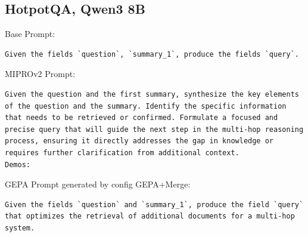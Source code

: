 \subsection{HotpotQA, Qwen3 8B}
\begin{instructbox}
Base Prompt:
\begin{lstlisting}[breakindent=0pt, breaklines=true, breakatwhitespace=true, frame=single, backgroundcolor=\color{gray!10}]
Given the fields `question`, `summary_1`, produce the fields `query`.
\end{lstlisting}

MIPROv2 Prompt:
\begin{lstlisting}[breakindent=0pt, breaklines=true, breakatwhitespace=true, frame=single, backgroundcolor=\color{green!10}]
Given the question and the first summary, synthesize the key elements of the question and the summary. Identify the specific information that needs to be retrieved or confirmed. Formulate a focused and precise query that will guide the next step in the multi-hop reasoning process, ensuring it directly addresses the gap in knowledge or requires further clarification from additional context.
Demos:

\end{lstlisting}

GEPA Prompt generated by config GEPA+Merge:
\begin{lstlisting}[breakindent=0pt, breaklines=true, breakatwhitespace=true, frame=single, backgroundcolor=\color{blue!10}]
Given the fields `question` and `summary_1`, produce the field `query` that optimizes the retrieval of additional documents for a multi-hop system.  


\end{lstlisting}
\end{instructbox}
